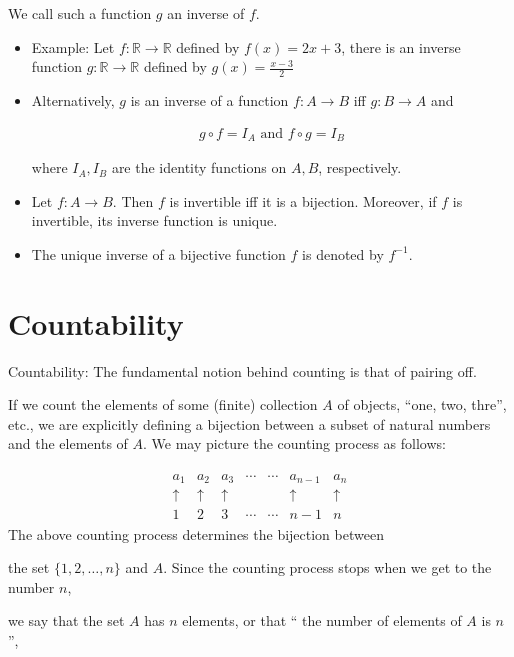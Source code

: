\documentclass[12pt,a4paper,fleqn]{article}
\begin{document}
  
  We call such a function \(g\) an inverse of \(f\). 
  \begin{itemize}
    \item Example: Let \(f: \mathbb{R} \rightarrow \mathbb{R}\) defined by \(f(x)=2 x+3\), there is an inverse function \(g: \mathbb{R} \rightarrow \mathbb{R}\) defined by \(g(x)=\frac{x-3}{2}\)
    \item Alternatively, \(g\) is an inverse of a function \(f: A \rightarrow B\) iff \(g: B \rightarrow A\) and
    
    \begin{align*}
    g \circ f=I_A \text { and } f \circ g=I_B
    \end{align*}
    
    where \(I_A, I_B\) are the identity functions on \(A, B\), respectively.
    \item Let \(f: A \rightarrow B\). Then \(f\) is invertible iff it is a bijection. Moreover, if \(f\) is invertible, its inverse function is unique.
    \item The unique inverse of a bijective function \(f\) is denoted by \(f^{-1}\).
  \end{itemize}
  
   \section{Countability} 

   Countability: The fundamental notion behind counting is that of pairing off.

   If we count the elements of some (finite) collection \(A\) of objects, ``one, two, thre'', etc., we are explicitly defining a bijection between a subset of natural numbers and the elements of \(A\). We may picture the counting process as follows:

\begin{align*}
\begin{array}{ccccccc}
a_1 & a_2 & a_3 & \cdots & \cdots & a_{n-1} & a_n \\
\uparrow & \uparrow & \uparrow & & & \uparrow & \uparrow \\
1 & 2 & 3 & \cdots & \cdots & n-1 & n
\end{array}
\end{align*}
The above counting process determines the bijection between 

the set \( \{ 1,2, \ldots, n\} \) and \(A\). Since the counting process stops when we get to the number \(n\), 

we say that the set \(A\) has \(n\) elements, or that `` the number of elements of \(A\) is \(n\)'', 
\end{document}
